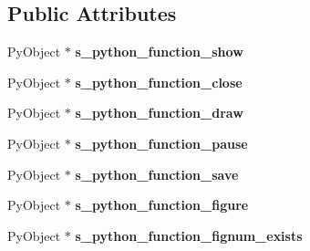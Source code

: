 \subsection*{Public Attributes}
\begin{DoxyCompactItemize}
\item 
Py\+Object $\ast$ {\bfseries s\+\_\+python\+\_\+function\+\_\+show}\hypertarget{structmatplotlibcpp_1_1detail_1_1__interpreter_a7630f4b6c75cb15e0979f94b9c84bc1e}{}\label{structmatplotlibcpp_1_1detail_1_1__interpreter_a7630f4b6c75cb15e0979f94b9c84bc1e}

\item 
Py\+Object $\ast$ {\bfseries s\+\_\+python\+\_\+function\+\_\+close}\hypertarget{structmatplotlibcpp_1_1detail_1_1__interpreter_a43f3de18936dd4d4ffef3046b64d686e}{}\label{structmatplotlibcpp_1_1detail_1_1__interpreter_a43f3de18936dd4d4ffef3046b64d686e}

\item 
Py\+Object $\ast$ {\bfseries s\+\_\+python\+\_\+function\+\_\+draw}\hypertarget{structmatplotlibcpp_1_1detail_1_1__interpreter_a3c4981fa6eea6f2bfc9bb2e685109032}{}\label{structmatplotlibcpp_1_1detail_1_1__interpreter_a3c4981fa6eea6f2bfc9bb2e685109032}

\item 
Py\+Object $\ast$ {\bfseries s\+\_\+python\+\_\+function\+\_\+pause}\hypertarget{structmatplotlibcpp_1_1detail_1_1__interpreter_ad4cc1ddd59ab9f4008269ade1a219ffa}{}\label{structmatplotlibcpp_1_1detail_1_1__interpreter_ad4cc1ddd59ab9f4008269ade1a219ffa}

\item 
Py\+Object $\ast$ {\bfseries s\+\_\+python\+\_\+function\+\_\+save}\hypertarget{structmatplotlibcpp_1_1detail_1_1__interpreter_a73bc4fbc6e14bf0df3dcde3554f7ac03}{}\label{structmatplotlibcpp_1_1detail_1_1__interpreter_a73bc4fbc6e14bf0df3dcde3554f7ac03}

\item 
Py\+Object $\ast$ {\bfseries s\+\_\+python\+\_\+function\+\_\+figure}\hypertarget{structmatplotlibcpp_1_1detail_1_1__interpreter_a5d283724b9e24217b5f4aef9950789fa}{}\label{structmatplotlibcpp_1_1detail_1_1__interpreter_a5d283724b9e24217b5f4aef9950789fa}

\item 
Py\+Object $\ast$ {\bfseries s\+\_\+python\+\_\+function\+\_\+fignum\+\_\+exists}\hypertarget{structmatplotlibcpp_1_1detail_1_1__interpreter_a3e29885c00054c68a9fc0d83e366c2d2}{}\label{structmatplotlibcpp_1_1detail_1_1__interpreter_a3e29885c00054c68a9fc0d83e366c2d2}


\end{DoxyCompactItemize}
